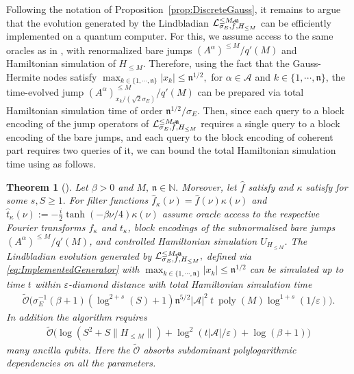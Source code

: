 \documentclass[11pt]{amsart}
\newcommand{\1}{\mathbbm{1}}
\newcommand{\N}{\mathbb{N}}
\newcommand{\eps}{\varepsilon}
\renewcommand{\epsilon}{\varepsilon}
\newcommand{\cA}{\mathcal{A}}
\theoremstyle{plain}
\newtheorem{theorem}{Theorem}[section]
\theoremstyle{definition}
\theoremstyle{remark}
\numberwithin{equation}{section}
\begin{document}
\noindent Following the notation of Proposition~\ref{prop:DiscreteGauss}, it remains to argue that the evolution generated by the Lindbladian $\mathcal{L}^{\le M,\mathfrak{n}}_{\smash{\sigma_E,\widehat{f},H_{\le M}}}$ can be efficiently implemented on a quantum computer. For this, we assume access to the same oracles as in \cite{ding2025efficient}, with renormalized bare jumps $ (A^{\alpha})^{\le M}/q'(M)$ and Hamiltonian simulation of $H_{\le M}$. Therefore, using the fact that the Gauss-Hermite nodes satisfy $\max_{k\in\{1,\cdots,\mathfrak{n}\}} |x_k|\le \mathfrak{n}^{1/2},$  for $\alpha\in\cA$ and $k\in\{1,\cdots,\mathfrak{n}\}$, the time-evolved jump $(A^{\alpha})^{\le M}_{x_k/(\sqrt{2}\sigma_E)}/q'(M)$ can be prepared via total Hamiltonian simulation time of order $  \mathfrak{n}^{1/2}/\sigma_E$. Then, since each query to a block encoding of the jump operators of $\mathcal{L}^{\le M,\mathfrak{n}}_{\smash{\sigma_E,\widehat{f},H_{\le M}}}$ requires a single query to a block encoding of the bare jumps, and each query to the block encoding of coherent part requires two queries of it, we can bound the total Hamiltonian simulation time using \cite[Theorem 18]{ding2025efficient} as follows. 

\begin{theorem}[{\cite[Theorem 18]{ding2025efficient}}]
\label{thm:Lin}
Let $\beta>0$ and $M,\,\mathfrak{n}\in\N.$ Moreover, let $\widehat f$ satisfy  and $\kappa$ satisfy  for some $s,S\ge 1.$  For filter functions $\widehat f_\kappa(\nu) = \widehat f(\nu)\kappa(\nu)$ and $\widehat t_\kappa(\nu) := -\frac{i}{2}\tanh(-\beta\nu/4)\kappa(\nu)$
assume oracle access to the respective Fourier transforms ${f}_\kappa$ and  $t_\kappa$, block encodings of the subnormalised bare jumps $(A^{\alpha})^{\le M}/q'(M)$, and controlled Hamiltonian simulation $U_{H_{\le M}}$. The Lindbladian evolution generated by $\mathcal{L}^{\le M,\mathfrak{n}}_{\smash{\sigma_E,\widehat{f},H_{\le M}}},$ defined via \eqref{eq:ImplementedGenerator} with $\max_{k\in\{1,\cdots,\mathfrak{n}\}} |x_k|\le \mathfrak{n}^{1/2}$ can be simulated up to time $t$ within $\epsilon$-diamond distance with total Hamiltonian simulation time
\begin{align*}
\widetilde {\mathcal{O}}\Big(\sigma_E^{-1} (\beta+1)\left(\log^{2+s}(S)+1\right)\mathfrak{n}^{5/2}|\cA|^2 \ t\ \operatorname{poly}(M)\log^{1+s}(1/\eps)\Big).
\end{align*}
In addition the algorithm requires 
\begin{align*}
\widetilde{\mathcal{O}}\Big(\log\left(S^2 +S\|H_{\le M}\|\right) + \log^2\left(t|\cA|/\eps\right) + \log\left(\beta+1\right)\Big)
\end{align*}
many ancilla qubits.
Here the $\widetilde{\mathcal{O}}$ absorbs subdominant polylogarithmic dependencies on all the parameters. 

\end{theorem}
\end{document}
